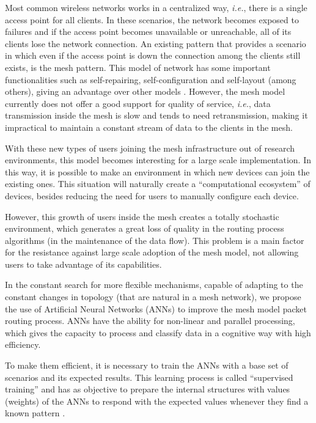 \documentclass[10pt, conference, compsocconf]{IEEEtran}
\begin{document}

Most common wireless networks works in a centralized way, \textit{i.e.}, there is a single access point for all clients. In these scenarios, the network becomes exposed to failures and if the access point becomes unavailable or unreachable, all of its clients lose the network connection. An existing pattern that provides a scenario in which even if the access point is down the connection among the clients still exists, is the mesh pattern. This model of network has some important functionalities such as self-repairing, self-configuration and self-layout (among others), giving an advantage over other models \cite{Akyildiz:1509968}.
However, the mesh model currently does not offer a good support for quality of service, \textit{i.e.}, data transmission inside the mesh is slow and tends to need retransmission, making it impractical to maintain a constant stream of data to the clients in the mesh.

With these new types of users joining the mesh infrastructure out of research environments, this model becomes interesting for a large scale implementation. In this way, it is possible to make an environment in which new devices can join the existing ones. This situation will naturally create a ``computational ecosystem'' of devices, besides reducing the need for users to manually configure each device.

However, this growth of users inside the mesh creates a totally stochastic environment, which generates a great loss of quality in the routing process algorithms (in the maintenance of the data flow). This problem is a main factor for the resistance against large scale adoption of the mesh model, not allowing users to take advantage of its capabilities.


In the constant search for more flexible mechanisms, capable of adapting to the constant changes in topology (that are natural in a mesh network), we propose the use of Artificial Neural Networks (ANNs) to improve the mesh model packet routing process. ANNs have the ability for non-linear and parallel processing, which gives the capacity to process and classify data in a cognitive way with high efficiency.

To make them efficient, it is necessary to train the ANNs with a base set of scenarios and its expected results. This learning process is called ``supervised training'' and has as objective to prepare the internal structures with values (weights) of the ANNs to respond with the expected values whenever they find a known pattern \cite{Claudio:1996}.
\end{document}
